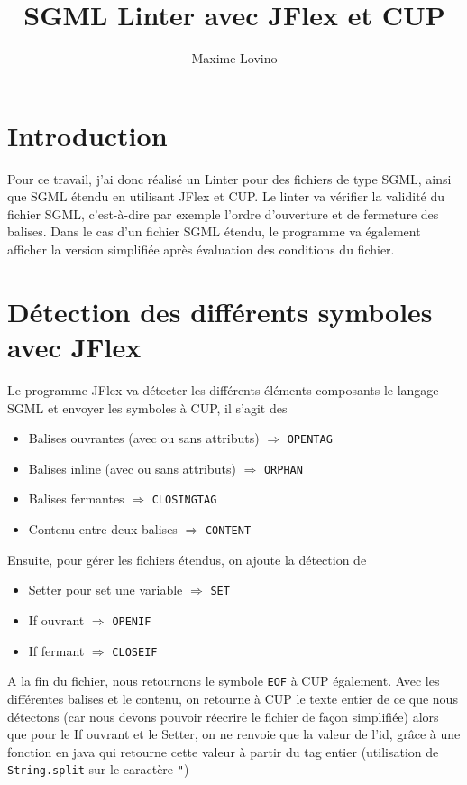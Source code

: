 \documentclass[a4paper]{article}
\title{SGML Linter avec JFlex et CUP}
\author{Maxime Lovino}
\begin{document}
\maketitle
\newpage
\section{Introduction}
Pour ce travail, j'ai donc réalisé un Linter pour des fichiers de type SGML, ainsi que SGML étendu en utilisant JFlex et CUP. Le linter va vérifier la validité du fichier SGML, c'est-à-dire par exemple l'ordre d'ouverture et de fermeture des balises. Dans le cas d'un fichier SGML étendu, le programme va également afficher la version simplifiée après évaluation des conditions du fichier.
\section{Détection des différents symboles avec JFlex}
Le programme JFlex va détecter les différents éléments composants le langage SGML et envoyer les symboles à CUP, il s'agit des \\
\begin{itemize}
	\item Balises ouvrantes (avec ou sans attributs) $\Rightarrow$ \verb+OPENTAG+
	\item Balises inline (avec ou sans attributs) $\Rightarrow$ \verb+ORPHAN+
	\item Balises fermantes $\Rightarrow$ \verb+CLOSINGTAG+
	\item Contenu entre deux balises $\Rightarrow$ \verb+CONTENT+ \\
\end{itemize}
Ensuite, pour gérer les fichiers étendus, on ajoute la détection de \\
\begin{itemize}
	\item Setter pour set une variable $\Rightarrow$ \verb+SET+
	\item If ouvrant $\Rightarrow$ \verb+OPENIF+
	\item If fermant $\Rightarrow$ \verb+CLOSEIF+ \\
\end{itemize}
A la fin du fichier, nous retournons le symbole \verb+EOF+ à CUP également. Avec les différentes balises et le contenu, on retourne à CUP le texte entier de ce que nous détectons (car nous devons pouvoir réecrire le fichier de façon simplifiée) alors que pour le If ouvrant et le Setter, on ne renvoie que la valeur de l'id, grâce à une fonction en java qui retourne cette valeur à partir du tag entier (utilisation de \verb+String.split+ sur le caractère \verb+"+)
\end{document}
